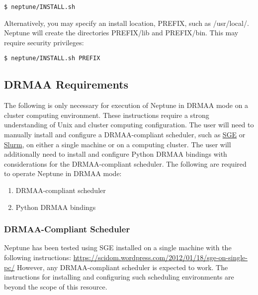 \documentclass[a4paper,10pt]{article}
\begin{document}
\begin{lstlisting}
$ neptune/INSTALL.sh
\end{lstlisting}

Alternatively, you may specify an install location, PREFIX, such as /usr/local/. Neptune will create the directories PREFIX/lib and PREFIX/bin. This may require security privileges:

\begin{lstlisting}
$ neptune/INSTALL.sh PREFIX
\end{lstlisting}

\newpage
\subsection{DRMAA Requirements}

The following is only necessary for execution of Neptune in DRMAA mode on a cluster computing environment. These instructions require a strong understanding of Unix and cluster computing configuration. The user will need to manually install and configure a DRMAA-compliant scheduler, such as \href{http://gridscheduler.sourceforge.net/}{SGE} or \href{http://slurm.schedmd.com/}{Slurm}, on either a single machine or on a computing cluster. The user will additionally need to install and configure Python DRMAA bindings with considerations for the DRMAA-compliant scheduler. The following are required to operate Neptune in DRMAA mode:

\begin{enumerate}
  \item DRMAA-compliant scheduler
  \item Python DRMAA bindings
\end{enumerate}

\subsubsection{DRMAA-Compliant Scheduler}

Neptune has been tested using SGE installed on a single machine with the following instructions:
\newline\newline
\url{https://scidom.wordpress.com/2012/01/18/sge-on-single-pc/}
\newline\newline
However, any DRMAA-compliant scheduler is expected to work. The instructions for installing and configuring such scheduling environments are beyond the scope of this resource.
\end{document}
